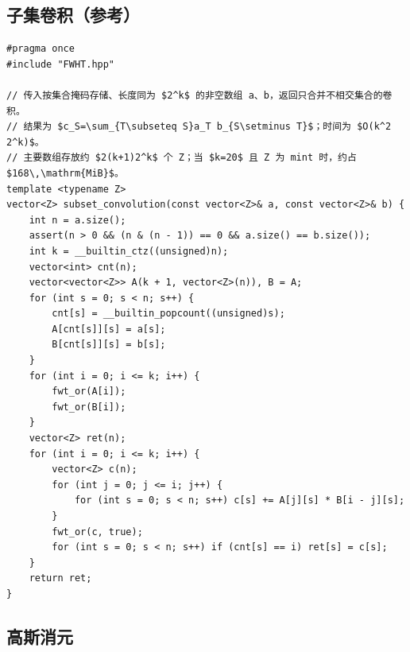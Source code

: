 \subsection{子集卷积（参考）}
\par

\begin{lstlisting}
#pragma once
#include "FWHT.hpp"

// 传入按集合掩码存储、长度同为 $2^k$ 的非空数组 a、b，返回只合并不相交集合的卷积。
// 结果为 $c_S=\sum_{T\subseteq S}a_T b_{S\setminus T}$；时间为 $O(k^2 2^k)$。
// 主要数组存放约 $2(k+1)2^k$ 个 Z；当 $k=20$ 且 Z 为 mint 时，约占 $168\,\mathrm{MiB}$。
template <typename Z>
vector<Z> subset_convolution(const vector<Z>& a, const vector<Z>& b) {
    int n = a.size();
    assert(n > 0 && (n & (n - 1)) == 0 && a.size() == b.size());
    int k = __builtin_ctz((unsigned)n);
    vector<int> cnt(n);
    vector<vector<Z>> A(k + 1, vector<Z>(n)), B = A;
    for (int s = 0; s < n; s++) {
        cnt[s] = __builtin_popcount((unsigned)s);
        A[cnt[s]][s] = a[s];
        B[cnt[s]][s] = b[s];
    }
    for (int i = 0; i <= k; i++) {
        fwt_or(A[i]);
        fwt_or(B[i]);
    }
    vector<Z> ret(n);
    for (int i = 0; i <= k; i++) {
        vector<Z> c(n);
        for (int j = 0; j <= i; j++) {
            for (int s = 0; s < n; s++) c[s] += A[j][s] * B[i - j][s];
        }
        fwt_or(c, true);
        for (int s = 0; s < n; s++) if (cnt[s] == i) ret[s] = c[s];
    }
    return ret;
}
\end{lstlisting}

\subsection{高斯消元}
\par

